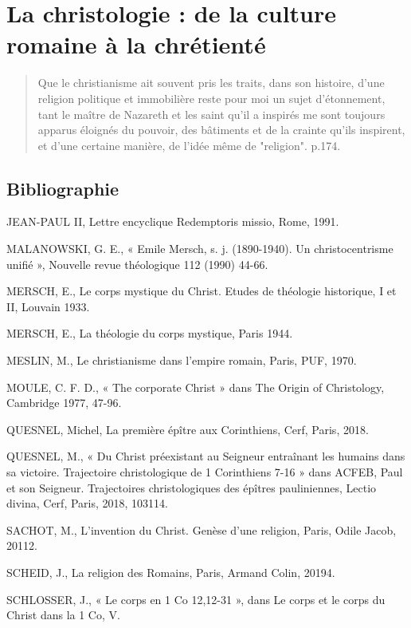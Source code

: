 \chapter{La christologie : de la culture romaine à la chrétienté }

\begin{quote}
    Que le christianisme ait souvent pris les traits, dans son histoire, d'une religion politique et immobilière reste pour moi un sujet d'étonnement, tant le maître de Nazareth et les saint qu'il a inspirés me sont toujours apparus éloignés du pouvoir, des bâtiments et de la crainte qu'ils inspirent, et d'une certaine manière, de l'idée même de "religion". \cite{Sureau:inigo} p.174.
\end{quote}
\section{ Bibliographie}

JEAN-PAUL II, Lettre encyclique Redemptoris missio, Rome, 1991. 

MALANOWSKI, G. E., « Emile Mersch, s. j. (1890-1940). Un christocentrisme unifié », Nouvelle revue théologique 112 (1990) 44-66.  

MERSCH, E., Le corps mystique du Christ. Etudes de théologie historique, I et II, Louvain 1933. 

MERSCH, E., La théologie du corps mystique, Paris 1944. 

MESLIN, M., Le christianisme dans l’empire romain, Paris, PUF, 1970. 

MOULE, C. F. D., « The corporate Christ » dans The Origin of Christology, Cambridge 1977, 47-96. 

QUESNEL, Michel, La première épître aux Corinthiens, Cerf, Paris, 2018. 

QUESNEL, M., « Du Christ préexistant au Seigneur entraînant les humains dans sa victoire. Trajectoire christologique de 1 Corinthiens 7-16 » dans ACFEB, Paul et son Seigneur. Trajectoires christologiques des épîtres pauliniennes, Lectio divina, Cerf, Paris, 2018, 103114. 

SACHOT, M., L’invention du Christ. Genèse d’une religion, Paris, Odile Jacob, 20112. 

SCHEID, J., La religion des Romains, Paris, Armand Colin, 20194. 

SCHLOSSER, J., « Le corps en 1 Co 12,12-31 », dans Le corps et le corps du Christ dans la 1 Co, V. 


